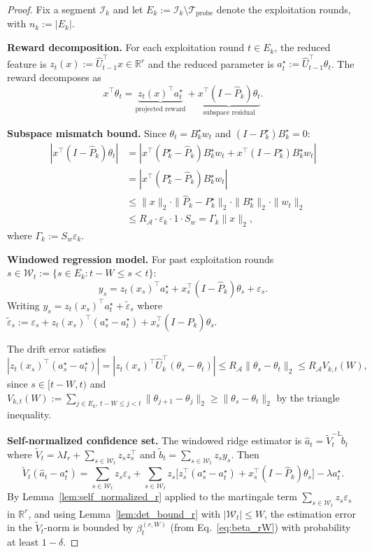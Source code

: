 \documentclass{article}
\newcommand{\R}{\mathbb{R}}
\newcommand{\cA}{\mathcal{A}}
\newcommand{\cI}{\mathcal{I}}
\newcommand{\cTprobe}{\mathcal{T}_{\mathrm{probe}}}
\begin{document}
\begin{proof}
Fix a segment $\cI_k$ and let $E_k := \cI_k \setminus \cTprobe$ denote the exploitation rounds, with $n_k := |E_k|$.

\textbf{Reward decomposition.}
For each exploitation round $t \in E_k$, the reduced feature is $z_t(x) := \widehat U_{t-1}^\top x \in \R^r$ and the reduced parameter is $a_t^\star := \widehat U_{t-1}^\top \theta_t$.  The reward decomposes as
\[
x^\top \theta_t
= \underbrace{z_t(x)^\top a_t^\star}_{\text{projected reward}}
+ \underbrace{x^\top (I - \widehat P_k)\theta_t}_{\text{subspace residual}}.
\]

\textbf{Subspace mismatch bound.}
Since $\theta_t = B_k^\star w_t$ and $(I - P_k^\star)B_k^\star = 0$:
\begin{align*}
|x^\top (I - \widehat P_k)\theta_t|
&= |x^\top(P_k^\star - \widehat P_k)B_k^\star w_t + x^\top(I - P_k^\star)B_k^\star w_t| \\
&= |x^\top(P_k^\star - \widehat P_k)B_k^\star w_t| \\
&\le \|x\|_2 \cdot \|\widehat P_k - P_k^\star\|_2 \cdot \|B_k^\star\|_2 \cdot \|w_t\|_2 \\
&\le R_{\cA} \cdot \varepsilon_k \cdot 1 \cdot S_w
= \Gamma_k \|x\|_2,
\end{align*}
where $\Gamma_k := S_w \varepsilon_k$.

\textbf{Windowed regression model.}
For past exploitation rounds $s \in \mathcal{W}_t := \{s \in E_k : t - W \le s < t\}$:
\[
y_s = z_t(x_s)^\top a_s^\star + x_s^\top(I - \widehat P_k)\theta_s + \varepsilon_s.
\]
Writing $y_s = z_t(x_s)^\top a_t^\star + \tilde\varepsilon_s$ where
$\tilde\varepsilon_s := \varepsilon_s + z_t(x_s)^\top(a_s^\star - a_t^\star) + x_s^\top(I - \widehat P_k)\theta_s$.

The drift error satisfies
\[
|z_t(x_s)^\top(a_s^\star - a_t^\star)|
= |z_t(x_s)^\top \widehat U_k^\top(\theta_s - \theta_t)|
\le R_{\cA} \|\theta_s - \theta_t\|_2
\le R_{\cA} V_{k,t}(W),
\]
since $s \in [t-W, t)$ and $V_{k,t}(W) := \sum_{j \in E_k,\, t-W \le j < t}\|\theta_{j+1} - \theta_j\|_2 \ge \|\theta_s - \theta_t\|_2$ by the triangle inequality.

\textbf{Self-normalized confidence set.}
The windowed ridge estimator is $\widehat a_t = \widetilde V_t^{-1}\widetilde b_t$ where $\widetilde V_t = \lambda I_r + \sum_{s \in \mathcal{W}_t} z_s z_s^\top$ and $\widetilde b_t = \sum_{s \in \mathcal{W}_t} z_s y_s$.  Then
\[
\widetilde V_t(\widehat a_t - a_t^\star)
= \sum_{s \in \mathcal{W}_t} z_s \varepsilon_s
+ \sum_{s \in \mathcal{W}_t} z_s \bigl[z_s^\top(a_s^\star - a_t^\star) + x_s^\top(I-\widehat P_k)\theta_s\bigr]
- \lambda a_t^\star.
\]
By Lemma~\ref{lem:self_normalized_r} applied to the martingale term $\sum_{s \in \mathcal{W}_t} z_s \varepsilon_s$ in $\R^r$, and using Lemma~\ref{lem:det_bound_r} with $|\mathcal{W}_t| \le W$, the estimation error in the $\widetilde V_t$-norm is bounded by $\beta_t^{(r,W)}$ (from Eq.~\eqref{eq:beta_rW}) with probability at least $1-\delta$.


\end{proof}
\end{document}
